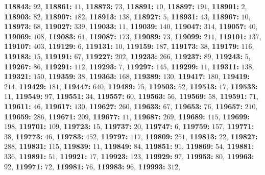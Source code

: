\textsf{\bfseries 118843:} $92$, \textsf{\bfseries 118861:} $11$, \textsf{\bfseries 118873:} $73$, \textsf{\bfseries 118891:} $10$, \textsf{\bfseries 118897:} $191$, \textsf{\bfseries 118901:} $2$, \textsf{\bfseries 118903:} $82$, \textsf{\bfseries 118907:} $182$, \textsf{\bfseries 118913:} $138$, \textsf{\bfseries 118927:} $5$, \textsf{\bfseries 118931:} $43$, \textsf{\bfseries 118967:} $10$, \textsf{\bfseries 118973:} $68$, \textsf{\bfseries 119027:} $339$, \textsf{\bfseries 119033:} $11$, \textsf{\bfseries 119039:} $140$, \textsf{\bfseries 119047:} $314$, \textsf{\bfseries 119057:} $40$, \textsf{\bfseries 119069:} $108$, \textsf{\bfseries 119083:} $61$, \textsf{\bfseries 119087:} $173$, \textsf{\bfseries 119089:} $73$, \textsf{\bfseries 119099:} $211$, \textsf{\bfseries 119101:} $137$, \textsf{\bfseries 119107:} $403$, \textsf{\bfseries 119129:} $6$, \textsf{\bfseries 119131:} $10$, \textsf{\bfseries 119159:} $187$, \textsf{\bfseries 119173:} $38$, \textsf{\bfseries 119179:} $116$, \textsf{\bfseries 119183:} $15$, \textsf{\bfseries 119191:} $67$, \textsf{\bfseries 119227:} $202$, \textsf{\bfseries 119233:} $266$, \textsf{\bfseries 119237:} $89$, \textsf{\bfseries 119243:} $5$, \textsf{\bfseries 119267:} $86$, \textsf{\bfseries 119291:} $112$, \textsf{\bfseries 119293:} $7$, \textsf{\bfseries 119297:} $145$, \textsf{\bfseries 119299:} $11$, \textsf{\bfseries 119311:} $138$, \textsf{\bfseries 119321:} $150$, \textsf{\bfseries 119359:} $38$, \textsf{\bfseries 119363:} $168$, \textsf{\bfseries 119389:} $130$, \textsf{\bfseries 119417:} $180$, \textsf{\bfseries 119419:} $214$, \textsf{\bfseries 119429:} $181$, \textsf{\bfseries 119447:} $640$, \textsf{\bfseries 119489:} $75$, \textsf{\bfseries 119503:} $52$, \textsf{\bfseries 119513:} $17$, \textsf{\bfseries 119533:} $11$, \textsf{\bfseries 119549:} $97$, \textsf{\bfseries 119551:} $34$, \textsf{\bfseries 119557:} $60$, \textsf{\bfseries 119563:} $56$, \textsf{\bfseries 119569:} $58$, \textsf{\bfseries 119591:} $71$, \textsf{\bfseries 119611:} $46$, \textsf{\bfseries 119617:} $130$, \textsf{\bfseries 119627:} $260$, \textsf{\bfseries 119633:} $67$, \textsf{\bfseries 119653:} $76$, \textsf{\bfseries 119657:} $210$, \textsf{\bfseries 119659:} $286$, \textsf{\bfseries 119671:} $209$, \textsf{\bfseries 119677:} $11$, \textsf{\bfseries 119687:} $269$, \textsf{\bfseries 119689:} $115$, \textsf{\bfseries 119699:} $198$, \textsf{\bfseries 119701:} $109$, \textsf{\bfseries 119723:} $15$, \textsf{\bfseries 119737:} $20$, \textsf{\bfseries 119747:} $6$, \textsf{\bfseries 119759:} $157$, \textsf{\bfseries 119771:} $38$, \textsf{\bfseries 119773:} $46$, \textsf{\bfseries 119783:} $452$, \textsf{\bfseries 119797:} $117$, \textsf{\bfseries 119809:} $251$, \textsf{\bfseries 119813:} $22$, \textsf{\bfseries 119827:} $288$, \textsf{\bfseries 119831:} $115$, \textsf{\bfseries 119839:} $11$, \textsf{\bfseries 119849:} $84$, \textsf{\bfseries 119851:} $91$, \textsf{\bfseries 119869:} $54$, \textsf{\bfseries 119881:} $336$, \textsf{\bfseries 119891:} $51$, \textsf{\bfseries 119921:} $17$, \textsf{\bfseries 119923:} $123$, \textsf{\bfseries 119929:} $97$, \textsf{\bfseries 119953:} $80$, \textsf{\bfseries 119963:} $92$, \textsf{\bfseries 119971:} $72$, \textsf{\bfseries 119981:} $76$, \textsf{\bfseries 119983:} $96$, \textsf{\bfseries 119993:} $312$, 
